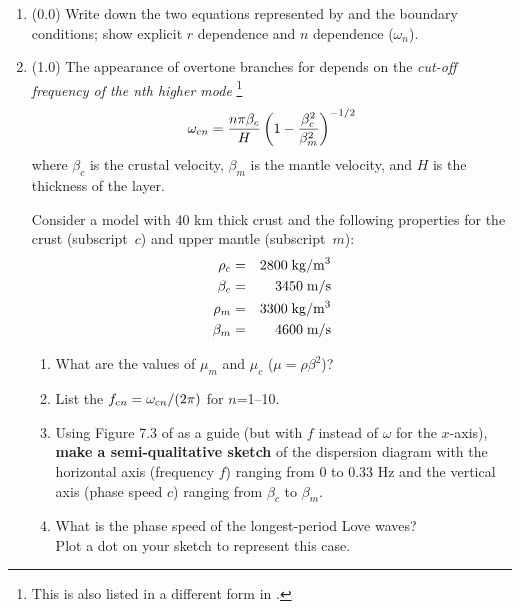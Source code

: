 \documentclass[11pt,titlepage,fleqn]{article}
\begin{document}
\begin{enumerate}

\item (0.0) Write down the two equations represented by  and the boundary conditions; show explicit $r$ dependence and $n$ dependence (\eg $\omega_n$). 


\item (1.0) The appearance of overtone branches for  depends on the {\em cut-off frequency of the nth higher mode} \citep[][Eq. 7.8]{AkiRichardsE2}\footnote{This is also listed in a different form in \citet[][p. 92]{SteinWysession}.}
%
\begin{equation}
\omega_{{\rm c}n} = \frac{n\pi \beta_c}{H} \left( 1 - \frac{\beta_c^2}{\beta_m^2}\right)^{-1/2}
\end{equation}
%
where $\beta_c$ is the crustal velocity, $\beta_m$ is the mantle velocity, and $H$ is the thickness of the layer.

Consider a model with 40 km thick crust and the following properties for the crust (subscript~$c$) and upper mantle (subscript~$m$):
%
\begin{eqnarray*}
\rho_c &=& 2800 \;{\rm kg/m^3}
\\
\beta_c &=& 3450 \;{\rm m/s}
\\
\rho_m &=& 3300 \;{\rm kg/m^3}
\\
\beta_m &=& 4600 \;{\rm m/s}
\end{eqnarray*}

\begin{enumerate}
\item What are the values of $\mu_m$ and $\mu_c$ ($\mu = \rho\beta^2$)?

\item List the $f_{{\rm c}n} = \omega_{{\rm c}n}/(2\pi)$ for $n$=1--10.

\item Using Figure 7.3 of \citet{AkiRichardsE2} as a guide (but with $f$ instead of $\omega$ for the $x$-axis), {\bf make a semi-qualitative sketch} of the dispersion diagram with the horizontal axis (frequency $f$) ranging from 0 to 0.33 Hz and the vertical axis (phase speed $c$) ranging from $\beta_c$ to $\beta_m$.

\item What is the phase speed of the longest-period Love waves? \\
Plot a dot on your sketch to represent this case.


\end{enumerate}
\end{enumerate}
\end{document}
